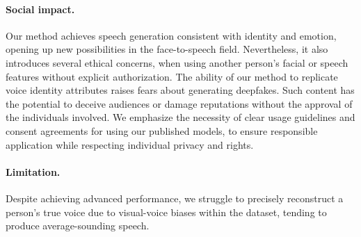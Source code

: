 \paragraph{Social impact.~~\xspace}
Our method achieves speech generation consistent with identity and emotion, opening up new possibilities in the face-to-speech field. 
Nevertheless, it also introduces several ethical concerns, when using another person’s facial or speech features without explicit authorization.
The ability of our method to replicate voice identity attributes raises fears about generating deepfakes. Such content has the potential to deceive audiences or damage reputations without the approval of the individuals involved.
We emphasize the necessity of clear usage guidelines and consent agreements for using our published models, to ensure responsible application while respecting individual privacy and rights.

\paragraph{Limitation.~~\xspace}
Despite achieving advanced performance, we struggle to precisely reconstruct a person’s true voice due to visual-voice biases within the dataset, tending to produce average-sounding speech. 
